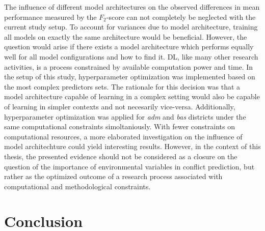 \documentclass[a4paper,11pt]{article}
\begin{document}
The influence of different model architectures on the observed differences in
mean performance measured by the \(F_2\)-score can not completely be neglected with
the current study setup. To account for variances due to model architecture,
training all models on exactly the same architecture would be beneficial. However,
the question would arise if there exists a model architecture which performs equally
well for all model configurations and how to find it. DL, like many other research
activities, is a process constrained by available computation power and time.
In the setup of this study, hyperparameter optimization was implemented based
on the most complex predictors sets. The rationale for this decision was that
a model architecture capable of learning in a complex setting would also be
capable of learning in simpler contexts and not necesarily vice-versa.
Additionally, hyperparameter optimization was applied for \emph{adm} and \emph{bas} districts
under the same computational constraints simoltaniously. With fewer constraints on
computational resources, a more elaborated investigation on the influence of
model architechture could yield interesting results. However, in the context of
this thesis, the presented evidence should not be considered as a closure on the
question of the importance of environmental variables in conflict prediction,
but rather as the optimized outcome of a research process associated with
computational and methodological constraints.

\newpage

\hypertarget{conclusion}{%
\section{Conclusion}\label{conclusion}}
\end{document}
